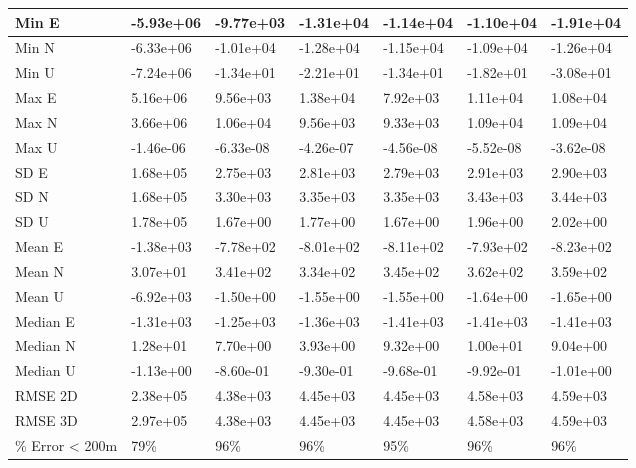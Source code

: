 \begin{longtable}{|l|l|l|l|l|l|l|}
        \hline
        \endlastfoot
        Min E          &  -5.93e+06 &  -9.77e+03 &  -1.31e+04 &  -1.14e+04 &  -1.10e+04 &   -1.91e+04 \\ \hline
        Min N          &  -6.33e+06 &  -1.01e+04 &  -1.28e+04 &  -1.15e+04 &  -1.09e+04 &   -1.26e+04 \\ \hline
        Min U          &  -7.24e+06 &  -1.34e+01 &  -2.21e+01 &  -1.34e+01 &  -1.82e+01 &   -3.08e+01 \\ \hline
        Max E          &   5.16e+06 &   9.56e+03 &   1.38e+04 &   7.92e+03 &   1.11e+04 &    1.08e+04 \\ \hline
        Max N          &   3.66e+06 &   1.06e+04 &   9.56e+03 &   9.33e+03 &   1.09e+04 &    1.09e+04 \\ \hline
        Max U          &  -1.46e-06 &  -6.33e-08 &  -4.26e-07 &  -4.56e-08 &  -5.52e-08 &   -3.62e-08 \\ \hline
        SD E           &   1.68e+05 &   2.75e+03 &   2.81e+03 &   2.79e+03 &   2.91e+03 &    2.90e+03 \\ \hline
        SD N           &   1.68e+05 &   3.30e+03 &   3.35e+03 &   3.35e+03 &   3.43e+03 &    3.44e+03 \\ \hline
        SD U           &   1.78e+05 &   1.67e+00 &   1.77e+00 &   1.67e+00 &   1.96e+00 &    2.02e+00 \\ \hline
        Mean E         &  -1.38e+03 &  -7.78e+02 &  -8.01e+02 &  -8.11e+02 &  -7.93e+02 &   -8.23e+02 \\ \hline
        Mean N         &   3.07e+01 &   3.41e+02 &   3.34e+02 &   3.45e+02 &   3.62e+02 &    3.59e+02 \\ \hline
        Mean U         &  -6.92e+03 &  -1.50e+00 &  -1.55e+00 &  -1.55e+00 &  -1.64e+00 &   -1.65e+00 \\ \hline
        Median E       &  -1.31e+03 &  -1.25e+03 &  -1.36e+03 &  -1.41e+03 &  -1.41e+03 &   -1.41e+03 \\ \hline
        Median N       &   1.28e+01 &   7.70e+00 &   3.93e+00 &   9.32e+00 &   1.00e+01 &    9.04e+00 \\ \hline
        Median U       &  -1.13e+00 &  -8.60e-01 &  -9.30e-01 &  -9.68e-01 &  -9.92e-01 &   -1.01e+00 \\ \hline
        RMSE 2D        &   2.38e+05 &   4.38e+03 &   4.45e+03 &   4.45e+03 &   4.58e+03 &    4.59e+03 \\ \hline
        RMSE 3D        &   2.97e+05 &   4.38e+03 &   4.45e+03 &   4.45e+03 &   4.58e+03 &    4.59e+03 \\ \hline
        \% Error < 200m &        79\% &        96\% &        96\% &        95\% &        96\% &         96\% \\ \hline
\end{longtable}
